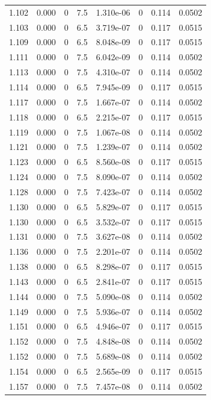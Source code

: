 \documentclass[preview]{standalone}
\begin{document}
{{{{{{{{{{{{{\begin{tabular}{L{1.2cm}C{1.2cm} C{0.3cm}C{0.5cm} C{1.4cm}C{1.4cm} C{1.4cm}C{1.4cm}}
  1.102  &  0.000  & 0     & 7.5 &  1.310e-06  & 0  & 0.114 &  0.0502   \\ 
  1.103  &  0.000  & 0     & 6.5 &  3.719e-07  & 0  & 0.117 &  0.0515   \\ 
  1.109  &  0.000  & 0     & 6.5 &  8.048e-09  & 0  & 0.117 &  0.0515   \\ 
  1.111  &  0.000  & 0     & 7.5 &  6.042e-09  & 0  & 0.114 &  0.0502   \\ 
  1.113  &  0.000  & 0     & 7.5 &  4.310e-07  & 0  & 0.114 &  0.0502   \\ 
  1.114  &  0.000  & 0     & 6.5 &  7.945e-09  & 0  & 0.117 &  0.0515   \\ 
  1.117  &  0.000  & 0     & 7.5 &  1.667e-07  & 0  & 0.114 &  0.0502   \\ 
  1.118  &  0.000  & 0     & 6.5 &  2.215e-07  & 0  & 0.117 &  0.0515   \\ 
  1.119  &  0.000  & 0     & 7.5 &  1.067e-08  & 0  & 0.114 &  0.0502   \\ 
  1.121  &  0.000  & 0     & 7.5 &  1.239e-07  & 0  & 0.114 &  0.0502   \\ 
  1.123  &  0.000  & 0     & 6.5 &  8.560e-08  & 0  & 0.117 &  0.0515   \\ 
  1.124  &  0.000  & 0     & 7.5 &  8.090e-07  & 0  & 0.114 &  0.0502   \\ 
  1.128  &  0.000  & 0     & 7.5 &  7.423e-07  & 0  & 0.114 &  0.0502   \\ 
  1.130  &  0.000  & 0     & 6.5 &  5.829e-07  & 0  & 0.117 &  0.0515   \\ 
  1.130  &  0.000  & 0     & 6.5 &  3.532e-07  & 0  & 0.117 &  0.0515   \\ 
  1.131  &  0.000  & 0     & 7.5 &  3.627e-08  & 0  & 0.114 &  0.0502   \\ 
  1.136  &  0.000  & 0     & 7.5 &  2.201e-07  & 0  & 0.114 &  0.0502   \\ 
  1.138  &  0.000  & 0     & 6.5 &  8.298e-07  & 0  & 0.117 &  0.0515   \\ 
  1.143  &  0.000  & 0     & 6.5 &  2.841e-07  & 0  & 0.117 &  0.0515   \\ 
  1.144  &  0.000  & 0     & 7.5 &  5.090e-08  & 0  & 0.114 &  0.0502   \\ 
  1.149  &  0.000  & 0     & 7.5 &  5.936e-07  & 0  & 0.114 &  0.0502   \\ 
  1.151  &  0.000  & 0     & 6.5 &  4.946e-07  & 0  & 0.117 &  0.0515   \\ 
  1.152  &  0.000  & 0     & 7.5 &  4.848e-08  & 0  & 0.114 &  0.0502   \\ 
  1.152  &  0.000  & 0     & 7.5 &  5.689e-08  & 0  & 0.114 &  0.0502   \\ 
  1.154  &  0.000  & 0     & 6.5 &  2.565e-09  & 0  & 0.117 &  0.0515   \\ 
  1.157  &  0.000  & 0     & 7.5 &  7.457e-08  & 0  & 0.114 &  0.0502   \\ 
\hline 
\end{tabular} 

}}}}}}}}}}}}}
\end{document}
